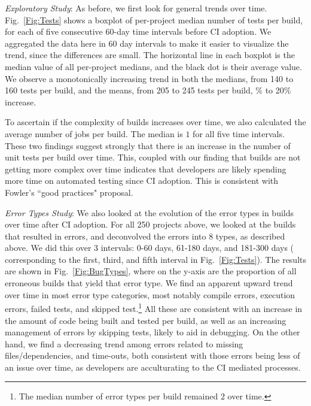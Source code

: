 \smallskip\noindent \emph{Exploratory Study}: 
As before, we first look for general trends over time.
Fig.~\ref{Fig:Tests} shows a boxplot of per-project median number of tests 
per build, for each of five consecutive 60-day time intervals before CI adoption.
We aggregated the data here in 60 day intervals to make it easier to visualize 
the trend, since the differences are small.
The horizontal line in each boxplot is the median value of all per-project medians, 
and the black dot is their average value.
We observe a monotonically increasing trend in both the medians, from 140 to 
160 tests per build, and the means, from 205 to 245 tests per build, \% to 
20\% increase. 

To ascertain if the complexity of builds increases over time, we also calculated 
the average number of jobs per build.
The median is $1$ for all five time intervals.
These two findings suggest strongly that there is an increase in the number of 
unit tests per build over time.
This, coupled with our finding that builds are not getting more complex over time indicates that developers are likely spending more time on 
automated testing since CI adoption.
This is consistent with Fowler's ``good practices" proposal.



\smallskip\noindent \emph{Error Types Study}:
We also looked at the evolution of the error types in builds over time after CI 
adoption.
For all 250 projects above, we looked at the builds that resulted in errors, 
and deconvolved the errors into 8 types, as described above.
We did this over 3 intervals: 0-60 days, 61-180 days, and 181-300 days (\ie 
corresponding to the first, third, and fifth interval in Fig.~\ref{Fig:Tests}).
The results are shown in Fig.~\ref{Fig:BugTypes}, where on the y-axis are 
the proportion of all erroneous builds that yield that error type.
We find an apparent upward trend over time in most error type categories, 
most notably compile errors, execution errors, failed tests, and skipped 
test.\footnote{The median number of error types per build remained $2$ over 
time.}
All these are consistent with an increase in the amount of code being built 
and tested per build, as well as an increasing management of errors by 
skipping tests, likely to aid in debugging.
On the other hand, we find a decreasing trend among errors related to missing 
files/dependencies, and time-outs, both consistent with those errors being less 
of an issue over time, as developers are acculturating to the CI mediated 
processes.

